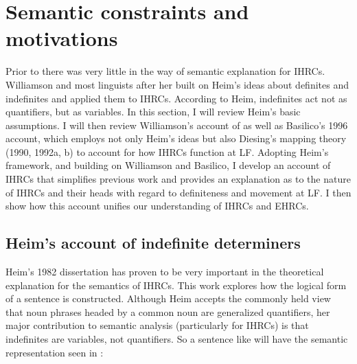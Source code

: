 \documentclass[output=paper]{LSP/langsci}
\begin{document}
\ea	\label{boyle38}
{\hspace{1em}}\newline

\z          
      
\section{Semantic constraints and motivations} 

Prior to \citet{Williamson1987} there was very little in the way of semantic explanation for IHRCs. Williamson and most linguists after her built on Heim's  ideas about definites and indefinites and applied them to IHRCs. According to Heim, indefinites act not as quantifiers, but as variables.  In this section, I will review Heim's basic assumptions. I will then review Williamson's account of \citet{IHRC1987} as well as Basilico's 1996 account, which employs not only Heim's ideas but also Diesing's mapping theory (1990, 1992a, b) to account for how IHRCs function at LF. Adopting Heim's framework, and building on Williamson and Basilico, I develop an account of IHRCs that simplifies previous work and provides an explanation as to the nature of IHRCs and their heads with regard to definiteness and movement at LF. I then show how this account unifies our understanding of IHRCs and EHRCs.

\subsection{Heim's account of indefinite determiners} 

Heim's 1982 dissertation has proven to be very important in the theoretical explanation for the semantics of IHRCs. This work explores how the logical form of a sentence is constructed. Although Heim accepts the commonly held view that noun phrases headed by a common noun are generalized quantifiers, her major contribution to semantic analysis (particularly for IHRCs) is that indefinites are variables, not quantifiers.  So a sentence like  will have the semantic representation seen in :
\end{document}
